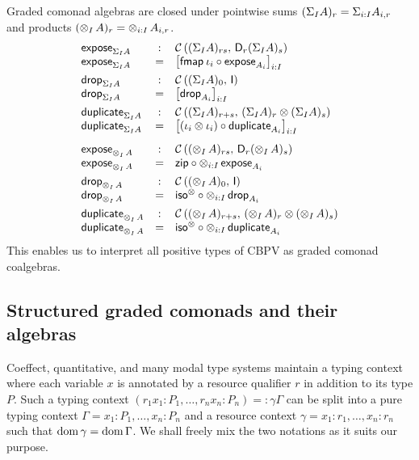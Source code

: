 \documentclass[acmsmall,review,anonymous]{acmart}\settopmatter{printfolios=true,printccs=false,printacmref=false}
\begin{document}
Graded comonad algebras are closed under pointwise sums $(\sumt I A)_r = \sumt {i:I} {A_{i,r}}$ and products $(\tupt I A)_r = \tupt {i:I} {A_{i,r}}$.
\[
\begin{array}{lcl}
  \expose[\sumt I A] & : & \Hom {(\sumt I A)_{rs}} {\D[r](\sumt I A)_s} \\
  \expose[\sumt I A] & = & \left[  \fmap{\iota_i} \comp \expose[A_i] \right]_{i:I}
\\[1ex]
  \tdrop[\sumt I A] & : & \Hom {(\sumt I A)_0} \I \\
  \tdrop[\sumt I A] & = & \left[ \tdrop[A_i] \right]_{i:I}
\\[1ex]
  \duplicate[\sumt I A] & : & \Hom {(\sumt I A)_{r+s}} {(\sumt I A)_r \otimes (\sumt I A)_s} \\
  \duplicate[\sumt I A] & = & \left[ (\iota_i \otimes \iota_i) \comp \duplicate[A_i] \right]_{i:I}
\\[2ex]
  \expose[\tupt I A] & : & \Hom {(\tupt I A)_{rs}} {\D[r](\tupt I A)_s} \\
  \expose[\tupt I A] & = & \tzip \comp \tupt {i:I} {\expose[A_i]}
\\[1ex]
  \tdrop[\tupt I A] & : & \Hom {(\tupt I A)_0} \I \\
  \tdrop[\tupt I A] & = & \isot \comp \tupt {i:I} {\tdrop[A_i]}
\\[1ex]
  \duplicate[\tupt I A] & : & \Hom {(\tupt I A)_{r+s}} {(\tupt I A)_r \otimes (\tupt I A)_s} \\
  \duplicate[\tupt I A] & = & \isot \comp \tupt {i:I} {\duplicate[A_i]}
\end{array}
\]
This enables us to interpret all positive types of CBPV as graded
comonad coalgebras.


\subsection{Structured graded comonads and their algebras}

Coeffect, quantitative, and many modal type systems maintain a typing
context where each variable $x$ is annotated by a resource qualifier
$r$ in addition to its type $P$.  Such a typing context
$(r_1x_1{:}P_1, \dots, r_nx_n{:}P_n) =: \gamma\Gamma$ can be
split into a pure typing context
$\Gamma = x_1{:}P_1, \dots, x_n{:}P_n$ and a resource context
$\gamma = x_1{:}r_1, \dots, x_n{:}r_n$ such that
$\dom \gamma = \dom \Gamma$.  We shall freely mix the two notations as
it suits our purpose.
\end{document}
